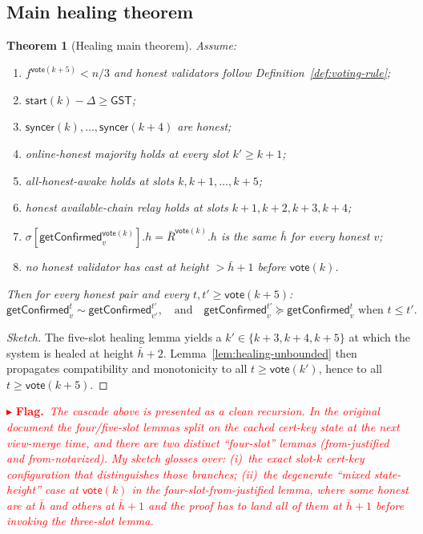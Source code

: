 \documentclass{article}
\newcommand{\start}{\mathsf{start}}
\newcommand{\vote}{\mathsf{vote}}
\newcommand{\syncer}{\mathsf{syncer}}
\newcommand{\GST}{\ensuremath{\mathsf{GST}}}
\newcommand{\OHM}{online-honest majority\xspace}
\newcommand{\HAR}{honest available-chain relay\xspace}
\newcommand{\AHA}{all-honest-awake\xspace}
\newcommand{\getConfirmed}{\textsf{getConfirmed}\xspace}
\newcommand{\comm}[1]{\bar{#1}}
\newcommand{\flag}[1]{%
  \par\smallskip\noindent\textcolor{red}{$\blacktriangleright$ \textbf{Flag.}~\textit{#1}}\par\smallskip}
\theoremstyle{plain}
\newtheorem{theorem}{Theorem}
\theoremstyle{definition}
\theoremstyle{remark}
\begin{document}
\subsection{Main healing theorem}

\begin{theorem}[Healing main theorem]\label{thm:healing-main}
Assume:
\begin{enumerate}
\item $f^{\vote(k+5)} < n/3$ and honest validators follow Definition~\ref{def:voting-rule};
\item $\start(k) - \Delta \geq \GST$;
\item $\syncer(k), \ldots, \syncer(k+4)$ are honest;
\item \OHM holds at every slot $k' \geq k+1$;
\item \AHA holds at slots $k, k+1, \ldots, k+5$;
\item \HAR holds at slots $k+1, k+2, k+3, k+4$;
\item $\sigma[\getConfirmed_v^{\vote(k)}].h = \comm{R}^{\vote(k)}.h$ is the same $\comm{h}$ for every honest $v$;
\item no honest validator has cast at height $> \comm{h}+1$ before $\vote(k)$.
\end{enumerate}
Then for every honest pair and every $t, t' \geq \vote(k+5)$:
\[
  \getConfirmed_v^t \sim \getConfirmed_{v'}^{t'}, \quad \text{and} \quad \getConfirmed_v^{t'} \succeq \getConfirmed_v^t \text{ when } t \leq t'.
\]
\end{theorem}

\begin{proof}[Sketch] The five-slot healing lemma yields a $k' \in \{k+3, k+4, k+5\}$ at which the system is healed at height $\comm{h}+2$. Lemma~\ref{lem:healing-unbounded} then propagates compatibility and monotonicity to all $t \geq \vote(k')$, hence to all $t \geq \vote(k+5)$. \end{proof}

\flag{The cascade above is presented as a clean recursion. In the original document the four/five-slot lemmas split on the cached cert-key state at the next view-merge time, and there are two distinct ``four-slot'' lemmas (from-justified and from-notarized). My sketch glosses over: (i)~the exact slot-$k$ cert-key configuration that distinguishes those branches; (ii)~the degenerate ``mixed state-height'' case at $\vote(k)$ in the four-slot-from-justified lemma, where some honest are at $\comm{h}$ and others at $\comm{h}+1$ and the proof has to land all of them at $\comm{h}+1$ before invoking the three-slot lemma.}
\end{document}
